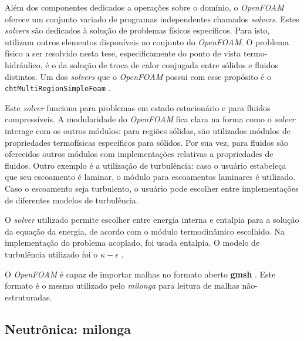 Além dos componentes dedicados a operações sobre o domínio, o \textit{OpenFOAM} oferece um conjunto variado
de programas independentes chamados \textit{solvers}. Estes \textit{solvers} são dedicados à solução de
problemas físicos específicos. Para isto, utilizam outros elementos disponíveis no conjunto do
\textit{OpenFOAM}. O problema físico a ser resolvido nesta tese, especificamente do ponto de vista
termo-hidráulico, é o da solução de troca de calor conjugada entre sólidos e
fluidos distintos. Um dos \textit{solvers} que o \textit{OpenFOAM} possui com esse propósito é o
\texttt{chtMultiRegionSimpleFoam} \cite{OpenFOAM2015}.

Este \textit{solver} funciona para problemas em estado estacionário e para
fluidos compressíveis. A modularidade do \textit{OpenFOAM}
fica clara na forma como o \textit{solver} interage com os outros módulos: para regiões sólidas,
são utilizados módulos de propriedades termofísicas específicos para sólidos. Por sua vez, para
fluidos são oferecidos outros módulos com implementações relativas a propriedades de fluidos.
Outro exemplo é a utilização de turbulência: caso o usuário estabeleça que seu escoamento é laminar,
o módulo para escoamentos laminares é utilizado. Caso o escoamento seja turbulento, o usuário pode
escolher entre implementações de diferentes modelos de turbulência.

O \textit{solver} utilizado permite escolher entre energia interna e entalpia para a solução
da equação da energia, de acordo com o módulo termodinâmico escolhido. Na implementação do
problema acoplado, foi usada entalpia. O modelo de turbulência utilizado foi o $\kappa-\epsilon$
\cite{Launder1974}.


O \textit{OpenFOAM} é capaz de importar malhas no formato aberto \textbf{gmsh} \cite{Geuzane2009}. Este
formato é o mesmo utilizado pelo \textit{milonga} para leitura de malhas não-estruturadas.




\subsection{Neutrônica: \textbf{milonga}}
\label{subs:milonga}


